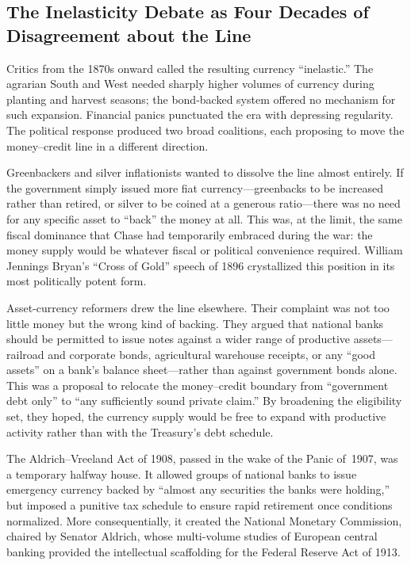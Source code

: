 \documentclass[12pt]{article}
\begin{document}
\subsection{The Inelasticity Debate as Four Decades of Disagreement
            about the Line}

Critics from the 1870s onward called the resulting currency
``inelastic.''  The agrarian South and West needed sharply higher
volumes of currency during planting and harvest seasons; the bond-backed
system offered no mechanism for such expansion.  Financial panics
punctuated the era with depressing regularity.  The political response
produced two broad coalitions, each proposing to move the
money--credit line in a different direction.

Greenbackers and silver inflationists wanted to dissolve the
line almost entirely.  If the government simply issued more fiat
currency---greenbacks to be increased rather than retired, or silver to
be coined at a generous ratio---there was no need for any specific asset
to ``back'' the money at all.  This was, at the limit, the same fiscal
dominance that Chase had temporarily embraced during the war: the money
supply would be whatever fiscal or political convenience required.
William Jennings Bryan's ``Cross of Gold'' speech of 1896 crystallized
this position in its most politically potent form.

Asset-currency reformers drew the line elsewhere.  Their complaint was
not too little money but the wrong kind of backing.  They argued that
national banks should be permitted to issue notes against a wider range
of productive assets---railroad and corporate bonds, agricultural
warehouse receipts, or any ``good assets'' on a bank's balance
sheet---rather than against government bonds alone.  This was a proposal
to relocate the money--credit boundary from ``government debt only'' to
``any sufficiently sound private claim.''  By broadening the eligibility
set, they hoped, the currency supply would be free to expand with
productive activity rather than with the Treasury's debt schedule.

The Aldrich--Vreeland Act of 1908, passed in the wake of the Panic
of~1907, was a temporary halfway house.  It allowed groups of national
banks to issue emergency currency backed by ``almost any securities the
banks were holding,'' but imposed a punitive tax schedule to ensure
rapid retirement once conditions normalized.  More consequentially, it
created the National Monetary Commission, chaired by Senator Aldrich,
whose multi-volume studies of European central banking provided the
intellectual scaffolding for the Federal Reserve Act of 1913.
\end{document}
